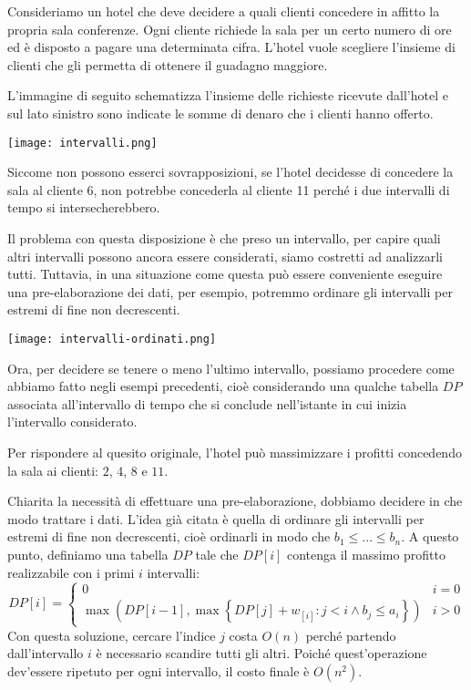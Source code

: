 \begin{eg}
    Consideriamo un hotel che deve decidere a quali clienti concedere in
    affitto la propria sala conferenze. Ogni cliente richiede la sala per
    un certo numero di ore ed è disposto a pagare una determinata cifra.
    L'hotel vuole scegliere l'insieme di clienti che gli permetta di ottenere
    il guadagno maggiore.

    \bigskip\noindent
    L'immagine di seguito schematizza l'insieme delle richieste ricevute
    dall'hotel e sul lato sinistro sono indicate le somme di denaro che i
    clienti hanno offerto.
    
    \newpage
    \begin{figure*}[ht!]
        \centering
        \texttt{[image: intervalli.png]}
    \end{figure*}\noindent
    Siccome non possono esserci sovrapposizioni, se l'hotel decidesse di
    concedere la sala al cliente 6, non potrebbe concederla al cliente 11
    perché i due intervalli di tempo si intersecherebbero.

    Il problema con questa disposizione è che preso un intervallo, per capire
    quali altri intervalli possono ancora essere considerati, siamo costretti ad
    analizzarli tutti. Tuttavia, in una situazione come questa può essere
    conveniente eseguire una pre-elaborazione dei dati, per esempio, potremmo
    ordinare gli intervalli per estremi di fine non decrescenti.

    \begin{figure*}[ht!]
        \centering
        \texttt{[image: intervalli-ordinati.png]}
    \end{figure*}\noindent
    Ora, per decidere se tenere o meno l'ultimo intervallo, possiamo procedere
    come abbiamo fatto negli esempi precedenti, cioè considerando una qualche
    tabella $DP$ associata all'intervallo di tempo che si conclude nell'istante
    in cui inizia l'intervallo considerato.

    \bigskip\noindent
    Per rispondere al quesito originale, l'hotel può massimizzare
    i profitti concedendo la sala ai clienti: $2$, $4$, $8$ e $11$.
\end{eg}

\noindent
Chiarita la necessità di effettuare una pre-elaborazione, dobbiamo decidere in
che modo trattare i dati. L'idea già citata è quella di ordinare gli intervalli
per estremi di fine non decrescenti, cioè ordinarli in modo che $b_1\leq
\dots\leq b_n$. A questo punto, definiamo una tabella $DP$ tale che $DP[i]$
contenga il massimo profitto realizzabile con i primi $i$ intervalli:
\[DP[i]=\begin{cases}
    0 & i=0\\
    \max\left(DP[i-1], \max\left\{DP[j]+w_[i]:j<i\wedge b_j\leq a_i\right\}\right)
    & i>0
\end{cases}\]
Con questa soluzione, cercare l'indice $j$ costa $O(n)$ perché partendo
dall'intervallo $i$ è necessario scandire tutti gli altri. Poiché quest'operazione
dev'essere ripetuto per ogni intervallo, il costo finale è $O(n^2)$.

